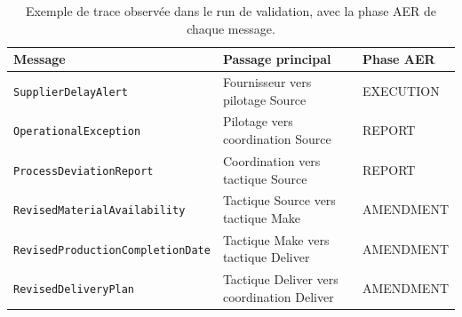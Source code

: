\begin{table}[H]
  \centering
  \small
  \begin{tabularx}{\textwidth}{L{0.27\textwidth} L{0.19\textwidth} Y}
    \toprule
    Message & Passage principal & Phase AER \\
    \midrule
    \texttt{Supplier\-Delay\-Alert} & Fournisseur vers pilotage Source & EXECUTION \\
    \texttt{Operational\-Exception} & Pilotage vers coordination Source & REPORT \\
    \texttt{Process\-Deviation\-Report} & Coordination vers tactique Source & REPORT \\
    \texttt{Revised\-Material\-Availability} & Tactique Source vers tactique Make & AMENDMENT \\
    \texttt{Revised\-Production\-Completion\-Date} & Tactique Make vers tactique Deliver & AMENDMENT \\
    \texttt{Revised\-Delivery\-Plan} & Tactique Deliver vers coordination Deliver & AMENDMENT \\
    \bottomrule
  \end{tabularx}
  \caption{Exemple de trace observée dans le run de validation, avec la phase AER de chaque message.}
  \label{tab:exemple-trace-annexe}
\end{table}

